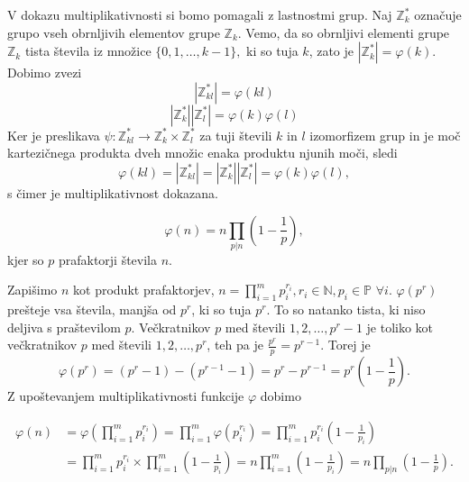 \documentclass[mat1]{fmfdelo}
\begin{document}
\begin{dokaz}
V dokazu multiplikativnosti si bomo pomagali z lastnostmi grup. 
Naj $\mathbb{Z}_{k}^\ast $ označuje grupo vseh obrnljivih elementov grupe $\mathbb{Z}_{k}$. Vemo, da so obrnljivi elementi grupe $\mathbb{Z}_{k}$ tista števila iz množice \( \{0, 1, \ldots, k-1 \}, \) ki so tuja $k$, zato je $|\mathbb{Z}_{k}^\ast| = \varphi(k).$  Dobimo zvezi
\[ |\mathbb{Z}_{kl}^\ast| = \varphi(kl) \]
\[ |\mathbb{Z}_{k}^\ast| |\mathbb{Z}_{l}^\ast| = \varphi(k) \varphi(l)\]
Ker je preslikava \( \psi \colon \mathbb{Z}_{kl}^\ast \rightarrow \mathbb{Z}_{k}^\ast \times \mathbb{Z}_{l}^\ast \) za tuji števili $k$ in $l$ izomorfizem grup in je moč kartezičnega produkta dveh množic enaka produktu njunih moči, sledi 
\[ \varphi(kl) = |\mathbb{Z}_{kl}^\ast| = |\mathbb{Z}_{k}^\ast| |\mathbb{Z}_{l}^\ast| = \varphi(k) \varphi(l), \]
s čimer je multiplikativnost dokazana.
\end{dokaz}

\begin{trditev}
\[ \varphi(n) = n \prod_{p|n} (1 - \frac{1}{p}), \] kjer so $p$ prafaktorji števila $n$.
\end{trditev}

\begin{dokaz}
Zapišimo $n$ kot produkt prafaktorjev, \( n = \prod_{i=1}^m p_i^{r_i}, r_i \in \mathbb{N}, p_i \in \mathbb{P} \) $\forall i$.
$\varphi(p^{r})$ prešteje vsa števila, manjša od $p^r$, ki so tuja $p^r$. To so natanko tista, ki niso deljiva s praštevilom $p$. Večkratnikov $p$ med števili $1, 2, \ldots, p^r-1$ je toliko kot večkratnikov $p$ med števili $1, 2, \ldots, p^r$, teh pa je \( \frac{p^r}{p} = p^{r-1}. \)
Torej je \[ \varphi(p^r) = (p^r - 1) - (p^{r-1} - 1) = p^r - p^{r-1} = p^r(1 - \frac{1}{p}). \] 
Z upoštevanjem multiplikativnosti funkcije $\varphi$ dobimo

\begin{equation}
\begin{split}
 \varphi(n) & = \varphi(\prod_{i=1}^m p_i^{r_i}) = \prod_{i=1}^m \varphi(p_i^{r_i}) = \prod_{i=1}^m p_i^{r_i}(1 - \frac{1}{p_i}) \\
& = \prod_{i=1}^m p_i^{r_i} \times \prod_{i=1}^m (1 - \frac{1}{p_i}) = n \prod_{i=1}^m (1 - \frac{1}{p_i}) = n \prod_{p|n} (1 - \frac{1}{p}).
\end{split}
\end{equation}

\end{dokaz}

\end{document}
